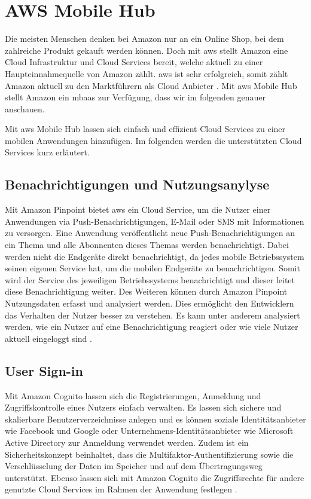 \section{AWS Mobile Hub}
Die meisten Menschen denken bei Amazon nur an ein Online Shop, bei dem zahlreiche Produkt gekauft werden können. Doch mit \gls{aws} stellt Amazon eine Cloud Infrastruktur und Cloud Services bereit, welche aktuell zu einer Haupteinnahmequelle von Amazon zählt. \gls{aws} ist sehr erfolgreich, somit zählt Amazon aktuell zu den Marktführern als Cloud Anbieter \cite{statistacloudmarketshare}. Mit \gls{aws} Mobile Hub stellt Amazon ein \gls{mbaas} zur Verfügung, dass wir im folgenden genauer anschauen. \newline 

Mit \gls{aws} Mobile Hub lassen sich einfach und effizient Cloud Services zu einer mobilen Anwendungen hinzufügen. Im folgenden werden die unterstützten Cloud Services kurz erläutert.


\subsection{Benachrichtigungen und Nutzungsanylyse}
Mit Amazon Pinpoint bietet \gls{aws} ein Cloud Service, um die Nutzer einer Anwendungen via Push-Benachrichtigungen, E-Mail oder SMS mit Informationen zu versorgen. Eine Anwendung veröffentlicht neue Push-Benachrichtigungen an ein Thema und alle Abonnenten dieses Themas werden benachrichtigt. Dabei werden nicht die Endgeräte direkt benachrichtigt, da jedes mobile Betriebssystem seinen eigenen Service hat, um die mobilen Endgeräte zu benachrichtigen. Somit wird der Service des jeweiligen Betriebssystems benachrichtigt und dieser leitet diese Benachrichtigung weiter. Des Weiteren können durch Amazon Pinpoint Nutzungsdaten erfasst und analysiert werden. Dies ermöglicht den Entwicklern das Verhalten der Nutzer besser zu verstehen. Es kann unter anderem  analysiert werden, wie ein Nutzer auf eine Benachrichtigung reagiert oder wie viele Nutzer aktuell eingeloggt sind \cite{AmazonPinpoint}.

\subsection{User Sign-in}
Mit Amazon Cognito lassen sich die Registrierungen, Anmeldung und Zugriffskontrolle eines Nutzers einfach verwalten. Es lassen sich sichere und skalierbare Benutzerverzeichnisse anlegen und es können soziale Identitätsanbieter wie Facebook und Google oder Unternehmens-Identitätsanbieter wie Microsoft Active Directory zur Anmeldung verwendet werden. Zudem ist ein Sicherheitskonzept beinhaltet, dass die Multifaktor-Authentifizierung sowie die Verschlüsselung der Daten im Speicher und auf dem Übertragungsweg unterstützt. Ebenso lassen sich mit Amazon Cognito die Zugriffsrechte für andere genutzte Cloud Services im Rahmen der Anwendung festlegen \cite{AmazonCognito}.

